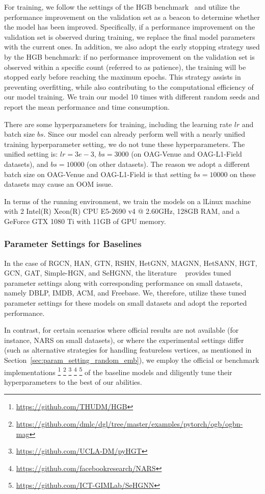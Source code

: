 \documentclass[lettersize,journal]{IEEEtran}
\begin{document}
For training, we follow the settings of the HGB benchmark~\cite{DBLP:conf/kdd/LvDLCFHZJDT21} and utilize the performance improvement on the validation set as a beacon to determine whether the model has been improved.
Specifically, if a performance improvement on the validation set is observed during training, we replace the final model parameters with the current ones.
In addition, we also adopt the early stopping strategy used by the HGB benchmark: if no performance improvement on the validation set is observed within a specific count (referred to as patience), the training will be stopped early before reaching the maximum epochs.
This strategy assists in preventing overfitting, while also contributing to the computational efficiency of our model training.
We train our model 10 times with different random seeds and report the mean performance and time consumption.




There are some hyperparameters for training, including the learning rate $lr$ and batch size $bs$.
Since our model can already perform well with a nearly unified training hyperparameter setting, we do not tune these hyperparameters.
The unified setting is: $lr = 3e-3$, $bs=3000$ (on OAG-Venue and OAG-L1-Field datasets), and $bs=10000$ (on other datasets).
The reason we adopt a different batch size on OAG-Venue and OAG-L1-Field is that setting $bs=10000$ on these datasets may cause an OOM issue.


In terms of the running environment, we train the models on a lLinux machine with 2 Intel(R) Xeon(R) CPU E5-2690 v4 @ 2.60GHz, 128GB RAM, and a GeForce GTX 1080 Ti with 11GB of GPU memory.







\subsubsection{Parameter Settings for Baselines}
In the case of RGCN, HAN, GTN, RSHN, HetGNN, MAGNN, HetSANN, HGT, GCN, GAT, Simple-HGN, and SeHGNN, the literature ~\cite{DBLP:conf/kdd/LvDLCFHZJDT21,yang2022simple} provides tuned parameter settings along with corresponding performance on small datasets, namely DBLP, IMDB, ACM, and Freebase.
We, therefore, utilize these tuned parameter settings for these models on small datasets and adopt the reported performance.

In contrast, for certain scenarios where official results are not available (for instance, NARS on small datasets), or where the experimental settings differ (such as alternative strategies for handling featureless vertices, as mentioned in Section~\ref{sec:param_setting_random_emb}), we employ the official or benchmark implementations
\footnote{\url{https://github.com/THUDM/HGB}}
\footnote{\url{https://github.com/dmlc/dgl/tree/master/examples/pytorch/ogb/ogbn-mag}}
\footnote{\url{https://github.com/UCLA-DM/pyHGT}}
\footnote{\url{https://github.com/facebookresearch/NARS}}
\footnote{\url{https://github.com/ICT-GIMLab/SeHGNN}} 
of the baseline models and diligently tune their hyperparameters to the best of our abilities.
\end{document}
